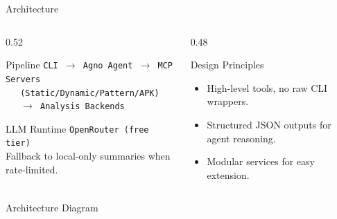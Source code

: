 \documentclass{beamer}
\begin{document}
\begin{frame}{Architecture}
  \begin{columns}[T]
    \begin{column}{0.52\textwidth}
      \begin{block}{Pipeline}
        \texttt{CLI $\to$ Agno Agent $\to$ MCP Servers}\\
        \texttt{$\quad$ (Static/Dynamic/Pattern/APK)}\\
        \texttt{$\quad$ $\to$ Analysis Backends}
      \end{block}
      \vspace{6pt}
      \begin{block}{LLM Runtime}
        \texttt{OpenRouter (free tier)}\\
        Fallback to local-only summaries when rate-limited.
      \end{block}
    \end{column}
    \begin{column}{0.48\textwidth}
      \begin{block}{Design Principles}
        \begin{itemize}
          \item High-level tools, no raw CLI wrappers.
          \item Structured JSON outputs for agent reasoning.
          \item Modular services for easy extension.
        \end{itemize}
      \end{block}
    \end{column}
  \end{columns}
\end{frame}

\begin{frame}{Architecture Diagram}
  \centering
\end{frame}
\end{document}
